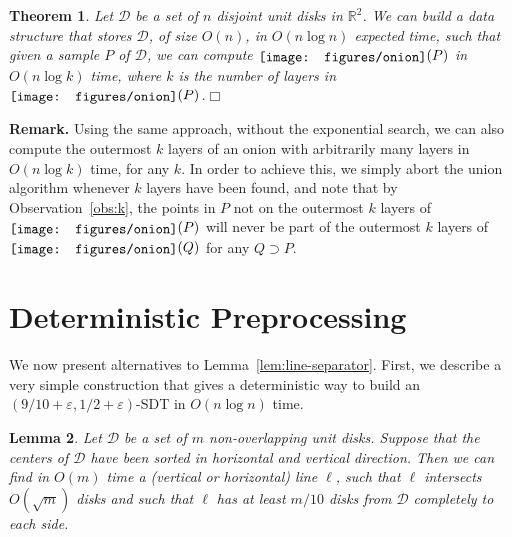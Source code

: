 \documentclass{paper}
\newcommand {\eps} {\varepsilon}
\newcommand {\R} {\mathbb {R}}
\newcommand {\script} [1] {\ensuremath {\mathcal {#1}}}
\newcommand {\D} {\script {D}}
\newcommand {\onion} {\raisebox{-0.25ex}{\texttt{[image: figures/onion]}}}
\newtheorem{theorem}{Theorem}[section]
\newtheorem{lemma}[theorem]{Lemma}
\begin{document}
\begin {theorem}
  Let $\D$ be a set of $n$ disjoint unit disks in $\R^2$.
  We can build a data structure that stores $\D$, of size $O (n)$, 
  in $O(n \log n)$ expected time, such that given a sample 
  $P$ of $\D$, we can compute 
  $\onion (P)$ in $O (n \log k)$ time, where $k$ is the number of layers in
  $\onion(P)$.\hfill$\Box$
\end {theorem}


\noindent\textbf{Remark.}
Using the same approach, without the exponential search, we can also 
compute the outermost $k$ layers of an onion with arbitrarily many layers 
in $O (n \log k)$ time, for any $k$.
In order to achieve this, we simply abort the union algorithm whenever 
$k$ layers have been found, and note that 
by Observation~\ref {obs:k},
the points in $P$ not on the 
outermost $k$ layers of $\onion (P)$ will never be part of the 
outermost $k$ layers of $\onion(Q)$ for any $Q \supset P$.

\section{Deterministic Preprocessing}\label{sec:derandomize}

We now present alternatives to Lemma~\ref{lem:line-separator}. 
First, we describe a very simple construction that
gives a deterministic way to build an $(9/10 + \eps, 1/2 + \eps)$-SDT
in $O(n \log n)$ time.

\begin{lemma}
Let $\D$ be a set of $m$ non-overlapping unit disks.
Suppose that the centers of $\D$ have been sorted in horizontal and vertical direction.
Then we can find in $O(m)$ time a (vertical or horizontal) line $\ell$, such that
$\ell$ intersects $O(\sqrt m)$ disks and such that $\ell$ has
at least $m/10$ disks from $\D$ completely to each side.
\end{lemma}
\end{document}
